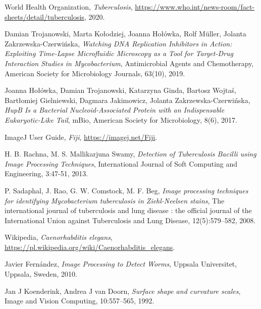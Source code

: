 \documentclass[declaration,shortabstract,mgr]{iithesis}
\begin{document}
\begin{thebibliography}{1}

  World Health Organization,
  \emph{Tuberculosis},
  \url{https://www.who.int/news-room/fact-sheets/detail/tuberculosis},
  2020.

  Damian Trojanowski, Marta Kołodziej, Joanna Hołówka, Rolf M{\"u}ller, Jolanta Zakrzewska-Czerwińska,
  \emph{Watching DNA Replication Inhibitors in Action: Exploiting Time-Lapse Microfluidic Microscopy as a Tool for Target-Drug Interaction Studies in Mycobacterium},
  Antimicrobial Agents and Chemotherapy,
  American Society for Microbiology Journals,
  63(10),
  2019.

  Joanna Hołówka, Damian Trojanowski, Katarzyna Ginda, Bartosz Wojtaś, Bartłomiej Gielniewski, Dagmara Jakimowicz, Jolanta Zakrzewska-Czerwińska,
  \emph{HupB Is a Bacterial Nucleoid-Associated Protein with an Indispensable Eukaryotic-Like Tail},
  mBio,
  American Society for Microbiology,
  8(6),
  2017.

  ImageJ User Guide,
  \emph{Fiji},
  \url{https://imagej.net/Fiji}.
  
  H. B. Rachna, M. S. Mallikarjuna Swamy,
  \emph{Detection of Tuberculosis Bacilli using Image Processing Techniques},
  International Journal of Soft Computing and Engineering,
  3:47-51,
  2013.

  P. Sadaphal, J. Rao, G. W. Comstock, M. F. Beg,
  \emph{Image processing techniques for identifying Mycobacterium tuberculosis in Ziehl-Neelsen stains},
  The international journal of tuberculosis and lung disease : the official journal of the International Union against Tuberculosis and Lung Disease,
  12(5):579–582,
  2008.

  Wikipedia,
  \emph{Caenorhabditis elegans},
  \url{https://pl.wikipedia.org/wiki/Caenorhabditis_elegans}.
  
  Javier Fernández,
  \emph{Image Processing to Detect Worms},
  Uppsala Universitet,
  Uppsala,
  Sweden,
  2010.

  Jan J Koenderink, Andrea J van Doorn,
  \emph{Surface shape and curvature scales},
  Image and Vision Computing,
  10:557--565,
  1992.


\end{thebibliography}
\end{document}
